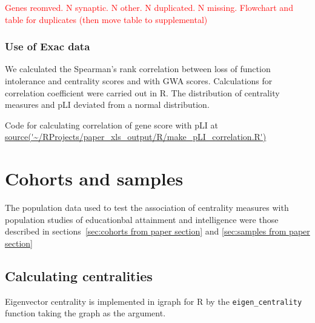 




 \textcolor{red}{ Genes reomved. N synaptic. N other. N duplicated. N missing. Flowchart and table for duplicates (then move table to supplemental)}

\subsubsection{Use of Exac data}

We calculated the Spearman's rank correlation between loss of function intolerance and centrality scores and with GWA scores. Calculations for correlation coefficient were carried out in R. The distribution of centrality measures and pLI deviated from a normal distribution. 


Code for calculating correlation of gene score with pLI at \url{source('~/RProjects/paper_xls_output/R/make_pLI_correlation.R')}
\section{Cohorts and samples}
\label{Centrality:cohorts and samples}
The population data used to test the association of centrality measures with population studies of educationbal attainment and intelligence were those described in sections~\ref{sec:cohorts from paper section} and \ref{sec:samples from paper section}

\subsection{Calculating centralities}
Eigenvector centrality is implemented in igraph for R by the \texttt{eigen\_centrality} function taking the graph as the argument.


